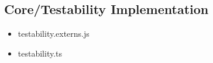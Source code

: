 \subsection{Core/Testability Implementation}


\begin{itemize}
  \item testability.externs.js
  \item testability.ts
\end{itemize}














